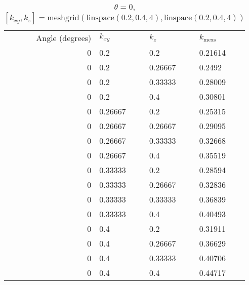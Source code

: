 \begin{table}[H]
\caption{\(\theta=0\), \([k_{xy}, k_z] = \textrm{meshgrid}(\textrm{linspace}(0.2, 0.4, 4), \textrm{linspace}(0.2, 0.4, 4))\)}
\begin{tabular}{r l l | l}
Angle (degrees) & \(k_{xy}\) & \(k_z\) & \(k_{\textrm{meas}}\)\\
0 & 0.2 & 0.2 & 0.21614\\
0 & 0.2 & 0.26667 & 0.2492\\
0 & 0.2 & 0.33333 & 0.28009\\
0 & 0.2 & 0.4 & 0.30801\\
0 & 0.26667 & 0.2 & 0.25315\\
0 & 0.26667 & 0.26667 & 0.29095\\
0 & 0.26667 & 0.33333 & 0.32668\\
0 & 0.26667 & 0.4 & 0.35519\\
0 & 0.33333 & 0.2 & 0.28594\\
0 & 0.33333 & 0.26667 & 0.32836\\
0 & 0.33333 & 0.33333 & 0.36839\\
0 & 0.33333 & 0.4 & 0.40493\\
0 & 0.4 & 0.2 & 0.31911\\
0 & 0.4 & 0.26667 & 0.36629\\
0 & 0.4 & 0.33333 & 0.40706\\
0 & 0.4 & 0.4 & 0.44717\\
\end{tabular}
\end{table}

